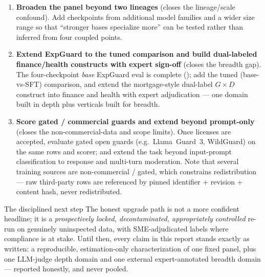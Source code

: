 \begin{enumerate}[leftmargin=1.9em,itemsep=3pt]
  \item \textbf{Broaden the panel beyond two lineages} (closes the lineage/scale confound). Add checkpoints from additional model families and a wider size range so that ``stronger bases specialize more'' can be tested rather than inferred from four coupled points.
  \item \textbf{Extend ExpGuard to the tuned comparison and build dual-labeled finance/health constructs with expert sign-off} (closes the breadth gap). The four-checkpoint \emph{base} ExpGuard eval is complete (); add the tuned (base-vs-SFT) comparison, and extend the mortgage-style dual-label $G\times D$ construct into finance and health with expert adjudication --- one domain built in depth plus verticals built for breadth.
  \item \textbf{Score gated / commercial guards and extend beyond prompt-only} (closes the non-commercial-data and scope limits). Once licenses are accepted, evaluate gated open guards (e.g.\ Llama~Guard~3, WildGuard) on the same rows and scorer; and extend the task beyond input-prompt classification to response and multi-turn moderation. Note that several training sources are non-commercial / gated, which constrains redistribution --- raw third-party rows are referenced by pinned identifier + revision + content hash, never redistributed.
\end{enumerate}

\begin{takeaway}{The disciplined next step}
The honest upgrade path is not a more confident headline; it is a \emph{prospectively locked, decontaminated, appropriately controlled} re-run on genuinely uninspected data, with SME-adjudicated labels where compliance is at stake. Until then, every claim in this report stands exactly as written: a reproducible, estimation-only characterization of one fixed panel, plus one LLM-judge depth domain and one external expert-annotated breadth domain --- reported honestly, and never pooled.
\end{takeaway}
